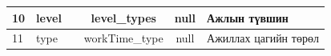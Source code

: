 \begin{table}[h]
\begin{tabular}{|l|l|c|c|c|l|}
    10                               & level                                     &                                                                     & level\_types                                                        & null                                                            & Ажлын түвшин                                                                                      \\ \hline
    11                               & type                                      &                                                                     & workTime\_type                                                      & null                                                            & Ажиллах цагийн төрөл                                                                              \\ \hline
    \end{tabular}
\end{table}
